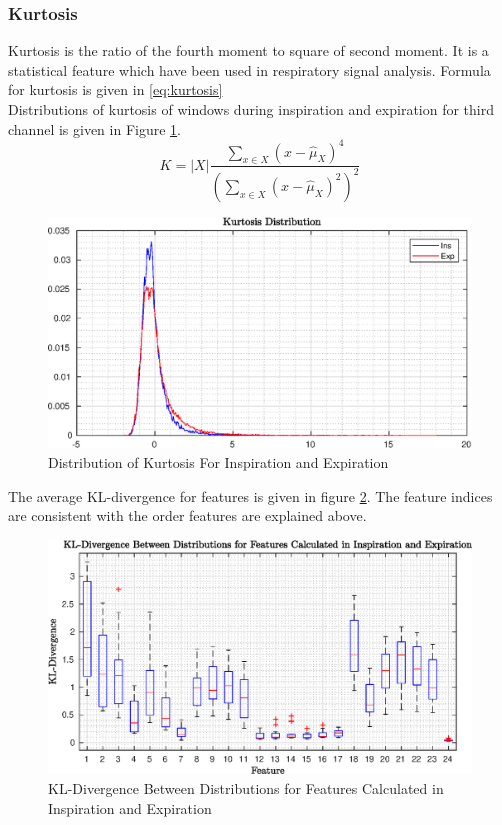 \subsubsection{Kurtosis}
Kurtosis is the ratio of the fourth moment to square of second moment. It is a statistical feature which have been used in respiratory signal analysis. Formula for kurtosis is given in \eqref{eq:kurtosis}\\ Distributions of kurtosis of windows during inspiration and expiration for third channel is given in Figure \ref{fig:kurtosis_ins_exp}. 
\begin{equation}\label{eq:kurtosis}
K = |X|\frac{\sum_{x \in X}(x-\hat{\mu}_X)^4}{(\sum_{x \in X}(x-\hat{\mu}_X)^2)^2}
\end{equation}
\begin{figure}
	\begin{center}
		\includegraphics[width=\textwidth]{figures/kurtosis_ins_exp.eps}
		\caption{Distribution of Kurtosis For Inspiration and Expiration}
		\label{fig:kurtosis_ins_exp}
	\end{center}
\end{figure} \par 
The average KL-divergence for features is given in figure \ref{fig:kl_divergence}. The feature indices are consistent with the order features are explained above.
\begin{figure}
	\begin{center}
		\includegraphics[width=\textwidth]{figures/kl_divergence.eps}
		\caption{KL-Divergence Between Distributions for Features Calculated in Inspiration and Expiration}
		\label{fig:kl_divergence}
	\end{center}
\end{figure} 
